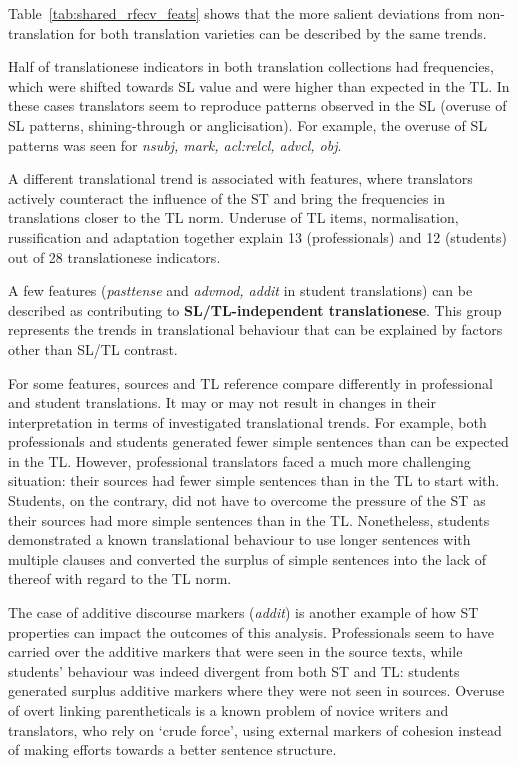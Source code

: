 Table~\ref{tab:shared_rfecv_feats} shows that the more salient deviations from non-translation for both translation varieties can be described by the same trends. 

Half of translationese indicators in both translation collections had frequencies, which were shifted towards SL value and were higher than expected in the TL. In these cases translators seem to reproduce patterns observed in the SL (overuse of SL patterns, shining-through or anglicisation). 
For example, the overuse of SL patterns was seen for \textit{nsubj, mark, acl:relcl, advcl, obj}.  

A different translational trend is associated with features, where translators actively counteract the influence of the ST and bring the frequencies in translations closer to the TL norm. Underuse of TL items, normalisation, russification and adaptation together explain 13 (professionals) and 12 (students) out of 28 translationese indicators. 

A few features (\textit{pasttense} and \textit{advmod, addit} in student translations) can be described as contributing to \textbf{SL/TL-independent translationese}. This group represents the trends in translational behaviour that can be explained by factors other than SL/TL contrast. 

For some features, sources and TL reference compare differently in professional and student translations. It may or may not result in changes in their interpretation in terms of investigated translational trends. 
For example, both professionals and students generated fewer simple sentences than can be expected in the TL. However, professional translators faced a much more challenging situation: their sources had fewer simple sentences than in the TL to start with. Students, on the contrary, did not have to overcome the pressure of the ST as their sources had more simple sentences than in the TL. Nonetheless, students demonstrated a known translational behaviour to use longer sentences with multiple clauses and converted the surplus of simple sentences into the lack of thereof with regard to the TL norm. 

The case of additive discourse markers (\textit{addit}) is another example of how ST properties can impact the outcomes of this analysis. Professionals seem to have carried over the additive markers that were seen in the source texts, while students' behaviour was indeed divergent from both ST and TL: students generated surplus additive markers where they were not seen in sources. Overuse of overt linking parentheticals is a known problem of novice writers and translators, who rely on `crude force', using external markers of cohesion instead of making efforts towards a better sentence structure.  

